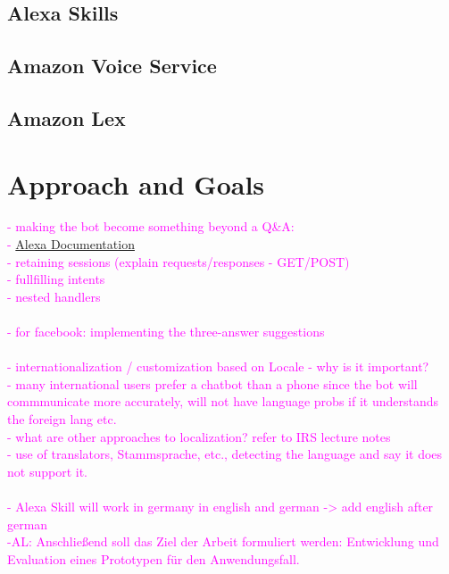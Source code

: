 \subsection{Alexa Skills}
\subsection{Amazon Voice Service}

\subsection{Amazon Lex}

\section{Approach and Goals}
\textcolor{magenta}{
	- making the bot become something beyond a Q\&A:\\
	- \href{https://www.youtube.com/watch?v=QxgdPI1B7rg}{Alexa Documentation}\\
	- retaining sessions (explain requests/responses - GET/POST)\\
	- fullfilling intents\\
	- nested handlers\\
	\\
	- for facebook: implementing the three-answer suggestions\\
	\\
	- internationalization / customization based on Locale
	- why is it important?\\
	- many international users prefer a chatbot than a phone since the bot will commmunicate more accurately, will not have language probs if it understands the foreign lang etc.\\
	- what are other approaches to localization? refer to IRS lecture notes\\
	- use of translators, Stammsprache, etc., detecting the language and say it does not support it.\\ 
	\\
	- Alexa Skill will work in germany in english and german -> add english after german\\
	-AL: Anschlie{\ss}end soll das Ziel der Arbeit formuliert werden: Entwicklung und Evaluation eines Prototypen f\"ur den Anwendungsfall.\\
}

